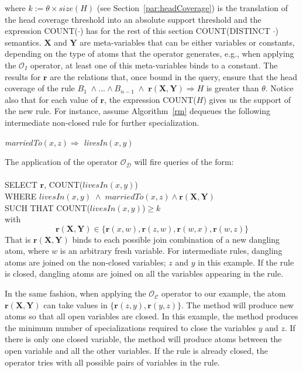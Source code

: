 where $k := \theta \times size(H)$ (see Section~\ref{par:headCoverage}) is the translation of the
head coverage threshold into an absolute support threshold and the expression COUNT($\cdot$) has for the rest of this section COUNT(DISTINCT $\cdot$) semantics.
$\bm{X}$ and $\bm{Y}$ are meta-variables that
can be either variables or constants, 
depending on the type of atoms that the operator generates, e.g., when applying the $\mathcal{O}_I$ operator, 
at least one of this meta-variables binds to a constant.
The results for $\bm{r}$ are the relations that, once bound in the query, ensure that the head coverage 
of the rule $B_1 \; \wedge ... \wedge B_{n-1} \;\wedge\; \bm{r}(\bm{X},\bm{Y}) \Rightarrow H$ is greater than $\theta$.
Notice also that for each value of $\bm{r}$, the expression COUNT($H$) gives us the support of the new rule.
For instance, assume Algorithm~\ref{rm} dequeues the following intermediate non-closed rule for further specialization.

\begin{center}
\emph{marriedTo}$(x,z) \Rightarrow $ \emph{livesIn}$(x,y)$
\end{center}

\noindent
The application of the operator $\mathcal{O_D}$ will fire queries of the form:\\ \\
SELECT $\bm{r}$, COUNT($livesIn(x,y)$) \\
WHERE $livesIn(x,y) \; \wedge \; marriedTo(x,z) \wedge \bm{r}(\bm{X}, \bm{Y})$\\
SUCH THAT COUNT($livesIn(x,y)$)$\ge k$\\

\noindent with 
\[
\bm{r}(\bm{X}, \bm{Y}) \in \{\bm{r}(x,w), \bm{r}(z,w), \bm{r}(w,x), \bm{r}(w,z) \}
\]
That is $\bm{r}(\bm{X}, \bm{Y})$ binds to each possible join combination of a new dangling atom,
where $w$ is an arbitrary fresh variable. For intermediate rules, dangling atoms are joined on the non-closed variables; 
$z$ and $y$ in this example.
If the rule is closed, dangling atoms are joined on all the variables appearing in the rule.

In the same fashion, when applying the $\mathcal{O_C}$ operator to our example, the atom $\bm{r}(\bm{X}, \bm{Y})$ 
can take values in $\{ \bm{r}(z,y), \bm{r}(y,z) \}$.
The method will produce new atoms so that all open variables are closed. In this example, the method produces the minimum number
of specializations required to close the variables $y$ and $z$. If there is only one closed variable, the method will produce atoms between
the open variable and all the other variables. If the rule is already closed, the operator tries with
all possible pairs of variables in the rule.

